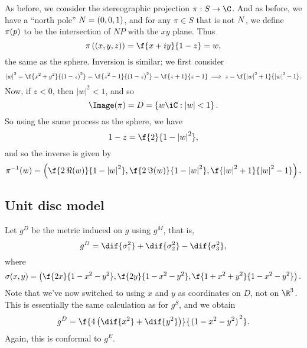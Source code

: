 As before, we consider the stereographic projection $\pi:S\to\C$. And as before, we have a ``north pole'' $N=(0,0,1)$, and for any $\pi\in S$ that is not $N$, we define $\pi(p)$ to be the intersection of $NP$ with the $xy$ plane. Thus
\begin{equation*}
	\pi\left( (x,y,z) \right) = \f{x+iy}{1-z} = w,
\end{equation*}
the same as the sphere. Inversion is similar; we first consider
\begin{equation*}
	\left\vert w \right\vert^2
	= \f{x^2+y^2}{\left( 1-z \right)^2}
	= \f{z^2-1}{\left( 1-z \right)^2}
	= \f{z+1}{z-1}
	\implies
	z = \f{\left\vert w \right\vert^2+1}{\left\vert w \right\vert^2-1}.
\end{equation*}
Now, if $z<0$, then $\left\vert w \right\vert^2<1$, and so
\begin{equation*}
	\Image(\pi) = D = \left\{w\iC: \left\vert w \right\vert<1\right\}.
\end{equation*}
So using the same process as the sphere, we have
\begin{equation*}
	1-z = \f{2}{1-\left\vert w \right\vert^2},
\end{equation*}
and so the inverse is given by
\begin{equation*}
	\pi^{-1}(w) = \left( \f{2\,\Re(w)}{1-\left\vert w \right\vert^2}, \f{2\,\Im(w)}{1-\left\vert w \right\vert^2}, \f{\left\vert w \right\vert^2+1}{\left\vert w \right\vert^2-1} \right).
\end{equation*}


\subsection{Unit disc model} %
\label{sub:unit_disc_model}

Let $g^D$ be the metric induced on $g$ using $g^M$, that is,
\begin{equation*}
	g^D = \dif{\sigma_1^2} + \dif{\sigma_2^2} - \dif{\sigma_3^2},
\end{equation*}
where
\begin{equation*}
	\sigma(x,y) = \left( \f{2x}{1-x^2-y^2}, \f{2y}{1-x^2-y^2}, \f{1+x^2+y^2}{1-x^2-y^2} \right).
\end{equation*}
Note that we've now switched to using $x$ and $y$ as coordinates on $D$, not on $\R^3$. This is essentially the same calculation as for $g^S$, and we obtain
\begin{equation*}
	g^D = \f{4\left( \dif{x^2} + \dif{y^2} \right)}{\left.(1-x^2-y^2)\right.^2}.
\end{equation*}
Again, this is conformal to $g^E$.

